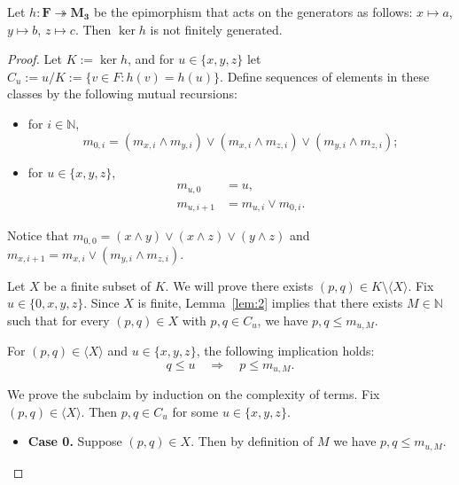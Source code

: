 \begin{proposition}
Let $h\colon \mathbf{F} \twoheadrightarrow \mathbf{M_3}$ be the epimorphism that acts on the generators as follows: $x\mapsto a$, $y\mapsto b$, $z\mapsto c.$ Then $\operatorname{ker} h$ is not finitely generated.
\end{proposition}
\begin{proof}
Let $K := \operatorname{ker} h$, and for $u \in \{x, y, z\}$ let $C_u := u/K := \{v \in F : h(v) = h(u)\}$.
Define sequences of elements in these classes by the following mutual recursions:
\begin{itemize}
\item for $i \in \mathbb N$,  
  \[m_{0, i} = (m_{x,i} \wedge m_{y,i}) \vee (m_{x,i} \wedge m_{z,i})\vee (m_{y,i} \wedge m_{z,i});\]

\item for $u \in \{x, y, z\}$,   
  \begin{align*}
    m_{u,0} &= u,\\  
    m_{u, i+1} &= m_{u, i}\vee m_{0,i}.
  \end{align*}
\end{itemize}

\noindent Notice that
$m_{0, 0} = (x\wedge y) \vee (x\wedge z)\vee (y\wedge z)$ and $m_{x, i+1} = m_{x,i} \vee (m_{y,i} \wedge m_{z,i})$.  

Let $X$ be a finite subset of $K$.  We will prove there exists $(p,q) \in K \setminus \langle X \rangle$.  
Fix $u\in \{0, x, y, z\}$. Since $X$ is finite, Lemma~\ref{lem:2} implies that there exists 
$M \in \mathbb{N}$ such that for every $(p, q) \in X$ with $p, q \in C_u$, we have $p, q \leqslant m_{u, M}$.

\begin{subclaim}\label{claim:2.1}
   For $(p,q) \in \langle X \rangle$ and $u \in \{x, y, z\}$, the following implication holds:
\begin{equation}
  \label{eq:star}
q \leqslant u \quad \Longrightarrow \quad p\leqslant m_{u, M}.
\end{equation}
\end{subclaim}
We prove the subclaim by induction on the complexity of terms.
Fix $(p,q) \in \langle X \rangle$. Then $p, q \in C_u$ for some $u\in \{x, y, z\}$.
\begin{itemize}
\item {\bf Case 0.} Suppose $(p, q) \in X$. Then by definition of $M$ we have $p, q \leqslant m_{u, M}$.


\end{itemize}
\end{proof}
